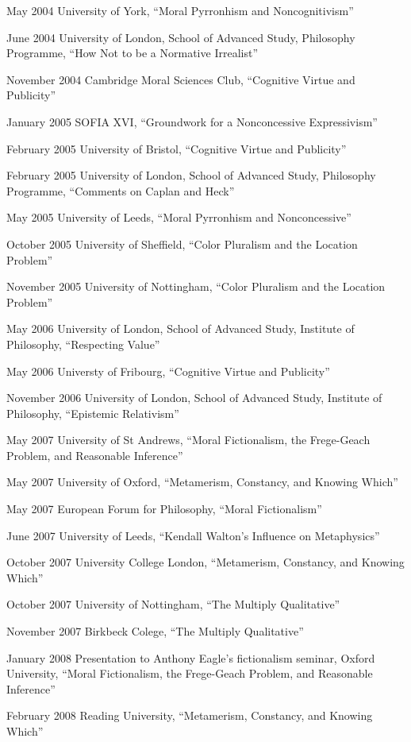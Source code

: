 \documentclass[contbibnum]{cv}
\begin{document}
\begin{topic}
    \item[May 2004] University of York, ``Moral Pyrronhism and Noncognitivism''
    \item[June 2004] University of London, School of Advanced Study, Philosophy Programme, ``How Not to be a Normative Irrealist''
    \item[November 2004] Cambridge Moral Sciences Club, ``Cognitive Virtue and Publicity''
    \item[January 2005] SOFIA XVI, ``Groundwork for a Nonconcessive Expressivism''
    \item[February 2005] University of Bristol, ``Cognitive Virtue and Publicity''
    \item[February 2005] University of London, School of Advanced Study, Philosophy Programme, ``Comments on Caplan and Heck''
    \item[May 2005] University of Leeds, ``Moral Pyrronhism and Nonconcessive''
    \item[October 2005] University of Sheffield, ``Color Pluralism and the Location Problem''
    \item[November 2005] University of Nottingham, ``Color Pluralism and the Location Problem''
    \item[May 2006] University of London, School of Advanced Study, Institute of Philosophy, ``Respecting Value''
    \item[May 2006] Universty of Fribourg, ``Cognitive Virtue and Publicity''
    \item[November 2006] University of London, School of Advanced Study, Institute of Philosophy, ``Epistemic Relativism''
    \item[May 2007] University of St Andrews, ``Moral Fictionalism, the Frege-Geach Problem, and Reasonable Inference''
    \item[May 2007] University of Oxford, ``Metamerism, Constancy, and Knowing Which''
    \item[May 2007] European Forum for Philosophy, ``Moral Fictionalism''
    \item[June 2007] University of Leeds, ``Kendall Walton's Influence on Metaphysics''
    \item [October 2007] University College London, ``Metamerism, Constancy, and Knowing Which''
    \item[October 2007] University of Nottingham, ``The Multiply Qualitative''
    \item[November 2007] Birkbeck Colege, ``The Multiply Qualitative''
    \item[January 2008] Presentation to Anthony Eagle's fictionalism seminar, Oxford University, ``Moral Fictionalism, the Frege-Geach Problem, and Reasonable Inference''
    \item[February 2008] Reading University, ``Metamerism, Constancy, and Knowing Which''
\end{topic}
\end{document}
